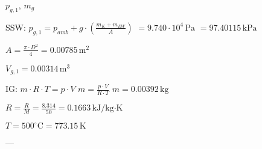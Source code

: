 \( p_{g,1} \), \( m_{g} \)  

SSW:  
\( p_{g,1} = p_{amb} + g \cdot \left( \frac{m_K + m_{EW}}{A} \right) \)  
\( = 9.740 \cdot 10^4 \, \text{Pa} \)  
\( = 97.40115 \, \text{kPa} \)  

\( A = \frac{\pi \cdot D^2}{4} = 0.00785 \, \text{m}^2 \)  

\( V_{g,1} = 0.00314 \, \text{m}^3 \)  

IG:  
\( m \cdot R \cdot T = p \cdot V \)  
\( m = \frac{p \cdot V}{R \cdot T} \)  
\( m = 0.00392 \, \text{kg} \)  

\( R = \frac{R}{M} = \frac{8.314}{50} = 0.1663 \, \text{kJ/kg·K} \)  

\( T = 500^\circ \text{C} = 773.15 \, \text{K} \)  

---
